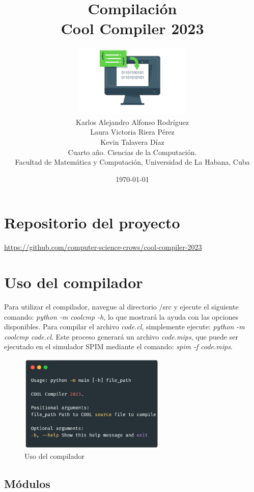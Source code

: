 \documentclass[10pt]{article} %
\title{\normalsize{Compilaci\'on}\\
	\Huge\bfseries Cool Compiler 2023 \\
} %
\author{%
	\includegraphics[width=15em]{logo.png}\\
	Karlos Alejandro Alfonso Rodríguez\\
	Laura Victoria Riera P\'erez\\
	Kevin Talavera Díaz \vspace{1em} \\
	\small Cuarto a\~no. Ciencias de la Computaci\'on. \\ %
	\small Facultad de Matem\'atica y Computaci\'on, Universidad de La Habana, Cuba \\ %
}
\date{\footnotesize \today } %
\begin{document}
	
	
	
	\maketitle
	
	
	\section*{Repositorio del proyecto}
	\begin{center}
		\url{https://github.com/computer-science-crows/cool-compiler-2023}
	\end{center}

	\section{Uso del compilador}
	
	Para utilizar el compilador, navegue al directorio /src y ejecute el siguiente comando: \textit{python -m coolcmp -h}, lo que mostrará la ayuda con las opciones disponibles. Para compilar el archivo \textit{code.cl}, simplemente ejecute: \textit{python -m coolcmp code.cl}. Este proceso generará un archivo \textit{code.mips}, que puede ser ejecutado en el simulador SPIM mediante el comando: \textit{spim -f code.mips}.
	
	\begin{figure}[H]
		\centering
		\includegraphics[width=7cm]{usage}
		\caption{Uso del compilador}
	\end{figure}

	\subsection{M\'odulos}
	
\end{document}
